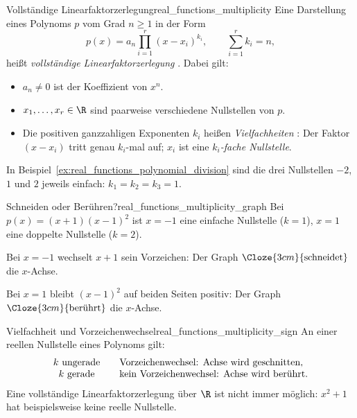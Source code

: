 \par\noindent\begin{minipage}{\linewidth}
\begin{DefinitionBox}{Vollständige Linearfaktorzerlegung}{real_functions_multiplicity}
  Eine Darstellung eines Polynoms $p$ vom Grad $n\ge1$ in der Form
  \[
    p(x)=a_n\prod_{i=1}^{r}(x-x_i)^{k_i},
    \qquad \sum_{i=1}^{r}k_i=n,
  \]
  heißt \emph{vollständige Linearfaktorzerlegung}
  . Dabei gilt:
  \begin{itemize}[nosep,leftmargin=*]
    \item $a_n\ne0$ ist der Koeffizient von $x^n$.
    \item $x_1,\ldots,x_r\in\R$ sind paarweise verschiedene Nullstellen von $p$.
    \item Die positiven ganzzahligen Exponenten $k_i$ heißen
      \emph{Vielfachheiten} :
      Der Faktor $(x-x_i)$ tritt genau $k_i$-mal auf;
      $x_i$ ist eine \emph{$k_i$-fache Nullstelle}.
  \end{itemize}
\end{DefinitionBox}
In Beispiel~\ref{ex:real_functions_polynomial_division} sind die drei Nullstellen
$-2$, $1$ und $2$ jeweils einfach: $k_1=k_2=k_3=1$.
\par\smallskip
\begin{ExampleBox}[before skip=0.3\baselineskip]{Schneiden oder Berühren?}{real_functions_multiplicity_graph}
  Bei $p(x)=(x+1)(x-1)^2$ ist $x=-1$ eine einfache Nullstelle ($k=1$),
  $x=1$ eine doppelte Nullstelle ($k=2$).
  \par\smallskip
  \begin{minipage}[c]{0.46\linewidth}
    Bei $x=-1$ wechselt $x+1$ sein Vorzeichen: Der Graph
    $\Cloze{3cm}{\text{schneidet}}$ die $x$-Achse.

    Bei $x=1$ bleibt $(x-1)^2$ auf beiden Seiten positiv: Der Graph
    $\Cloze{3cm}{\text{berührt}}$ die $x$-Achse.
  \end{minipage}\hfill
  \begin{minipage}[c]{0.50\linewidth}
    \centering
  \end{minipage}
\end{ExampleBox}
\end{minipage}

\begin{KeyPointBox}{Vielfachheit und Vorzeichenwechsel}{real_functions_multiplicity_sign}
  An einer reellen Nullstelle eines Polynoms gilt:
  \[
    \begin{array}{c@{\qquad}l}
      k\text{ ungerade}&\text{Vorzeichenwechsel: Achse wird geschnitten},\\
      k\text{ gerade}&\text{kein Vorzeichenwechsel: Achse wird berührt}.
    \end{array}
  \]
  Eine vollständige Linearfaktorzerlegung über $\R$ ist nicht immer möglich:
  $x^2+1$ hat beispielsweise keine reelle Nullstelle.
\end{KeyPointBox}
